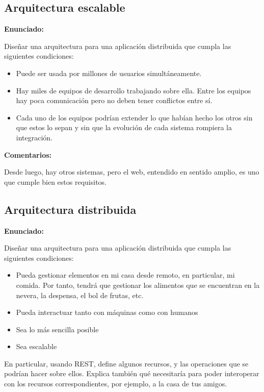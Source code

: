 \subsection{Arquitectura escalable}
\label{subsec:arq-escalable}

\textbf{Enunciado:}

Diseñar una arquitectura para una aplicación distribuida que cumpla las siguientes condiciones:

\begin{itemize}
\item Puede ser usada por millones de usuarios simultáneamente.
\item Hay miles de equipos de desarrollo trabajando sobre ella. Entre los equipos hay poca comunicación pero no deben tener conflictos entre sí.
\item Cada uno de los equipos podrían extender lo que habían hecho los otros sin que estos lo sepan y sin que la evolución de cada sistema rompiera la integración.
\end{itemize}

\textbf{Comentarios:}

Desde luego, hay otros sistemas, pero el web, entendido en sentido amplio, es uno que cumple bien estos requisitos.


\subsection{Arquitectura distribuida}
\label{subsec:arq-distribuida}

\textbf{Enunciado:}

Diseñar una arquitectura para una aplicación distribuida que cumpla las siguientes condiciones:

\begin{itemize}
\item Pueda gestionar elementos en mi casa desde remoto, en particular, mi comida. Por tanto, tendrá que gestionar los alimentos que se encuentran en la nevera, la despensa, el bol de frutas, etc.
\item Pueda interactuar tanto con máquinas como con humanos
\item Sea lo más sencilla posible
\item Sea escalable
\end{itemize}

En particular, usando REST, define algunos recursos, y las operaciones que se podrían hacer sobre ellos. Explica también qué necesitaría para poder interoperar con los recursos correspondientes, por ejemplo, a la casa de tus amigos.

